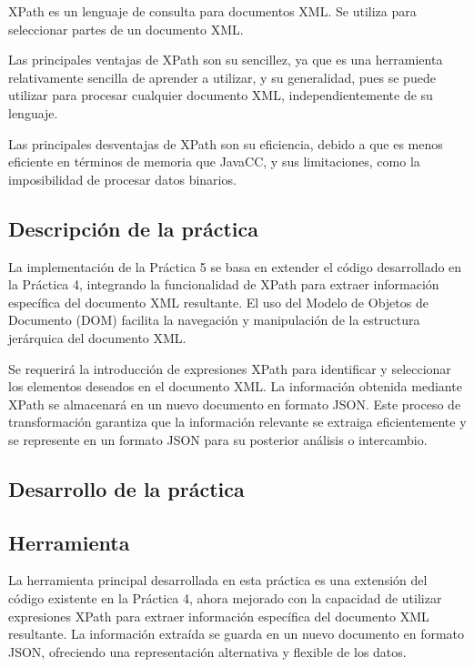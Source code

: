 XPath es un lenguaje de consulta para documentos XML. Se utiliza para seleccionar partes de un documento XML.

Las principales ventajas de XPath son su sencillez, ya que es una herramienta relativamente sencilla de aprender a utilizar, y su generalidad, pues se puede utilizar para procesar cualquier documento XML, independientemente de su lenguaje.

Las principales desventajas de XPath son su eficiencia, debido a que es menos eficiente en términos de memoria que JavaCC, y sus limitaciones, como la imposibilidad de procesar datos binarios.


\subsection{Descripción de la práctica}

\noindent La implementación de la Práctica 5 se basa en extender el código desarrollado en la Práctica 4, integrando la funcionalidad de XPath para extraer información específica del documento XML resultante. El uso del Modelo de Objetos de Documento (DOM) facilita la navegación y manipulación de la estructura jerárquica del documento XML.

Se requerirá la introducción de expresiones XPath para identificar y seleccionar los elementos deseados en el documento XML. La información obtenida mediante XPath se almacenará en un nuevo documento en formato JSON. Este proceso de transformación garantiza que la información relevante se extraiga eficientemente y se represente en un formato JSON para su posterior análisis o intercambio.

\subsection{Desarrollo de la práctica}

\subsection{Herramienta}

\noindent La herramienta principal desarrollada en esta práctica es una extensión del código existente en la Práctica 4, ahora mejorado con la capacidad de utilizar expresiones XPath para extraer información específica del documento XML resultante. La información extraída se guarda en un nuevo documento en formato JSON, ofreciendo una representación alternativa y flexible de los datos.

